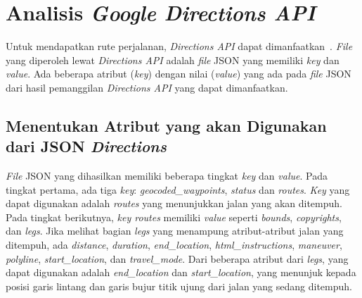 \section{Analisis \textit{Google Directions API}}
Untuk mendapatkan rute perjalanan, \textit{Directions API} dapat dimanfaatkan~\cite{directions-api}. \textit{File} yang diperoleh lewat \textit{Directions API} adalah \textit{file} JSON yang memiliki \textit{key} dan \textit{value}. Ada beberapa atribut (\textit{key}) dengan nilai (\textit{value}) yang ada pada \textit{file} JSON dari hasil pemanggilan \textit{Directions API} yang dapat dimanfaatkan.

\subsection{Menentukan Atribut yang akan Digunakan dari JSON \textit{Directions}}
\textit{File} JSON yang dihasilkan memiliki beberapa tingkat \textit{key} dan \textit{value}. Pada tingkat pertama, ada tiga \textit{key}: \textit{geocoded\_waypoints}, \textit{status} dan \textit{routes}. \textit{Key} yang dapat digunakan adalah \textit{routes} yang menunjukkan jalan yang akan ditempuh. Pada tingkat berikutnya, \textit{key routes} memiliki \textit{value} seperti \textit{bounds}, \textit{copyrights}, dan \textit{legs}. Jika melihat bagian \textit{legs} yang menampung atribut-atribut jalan yang ditempuh, ada {\it distance}, {\it duration}, {\it end\_location}, {\it html\_instructions}, {\it maneuver}, {\it polyline}, {\it start\_location}, dan \textit{travel\_mode}. Dari beberapa atribut dari \textit{legs}, yang dapat digunakan adalah \textit{end\_location} dan \textit{start\_location}, yang menunjuk kepada posisi garis lintang dan garis bujur titik ujung dari jalan yang sedang ditempuh. 

